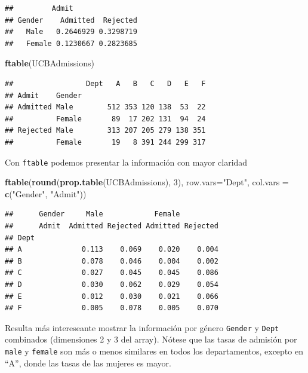 \documentclass[]{book}
\newenvironment{Shaded}{\begin{snugshade}}{\end{snugshade}}
\newcommand{\KeywordTok}[1]{\textcolor[rgb]{0.13,0.29,0.53}{\textbf{#1}}}
\newcommand{\DataTypeTok}[1]{\textcolor[rgb]{0.13,0.29,0.53}{#1}}
\newcommand{\DecValTok}[1]{\textcolor[rgb]{0.00,0.00,0.81}{#1}}
\newcommand{\StringTok}[1]{\textcolor[rgb]{0.31,0.60,0.02}{#1}}
\newcommand{\NormalTok}[1]{#1}
\begin{document}
\begin{verbatim}
##         Admit
## Gender    Admitted  Rejected
##   Male   0.2646929 0.3298719
##   Female 0.1230667 0.2823685
\end{verbatim}

\begin{Shaded}
\begin{Highlighting}[]
\KeywordTok{ftable}\NormalTok{(UCBAdmissions)}
\end{Highlighting}
\end{Shaded}

\begin{verbatim}
##                 Dept   A   B   C   D   E   F
## Admit    Gender                             
## Admitted Male        512 353 120 138  53  22
##          Female       89  17 202 131  94  24
## Rejected Male        313 207 205 279 138 351
##          Female       19   8 391 244 299 317
\end{verbatim}

Con \texttt{ftable} podemos presentar la información con mayor claridad

\begin{Shaded}
\begin{Highlighting}[]
\KeywordTok{ftable}\NormalTok{(}\KeywordTok{round}\NormalTok{(}\KeywordTok{prop.table}\NormalTok{(UCBAdmissions), }\DecValTok{3}\NormalTok{),}
       \DataTypeTok{row.vars=}\StringTok{"Dept"}\NormalTok{, }\DataTypeTok{col.vars =} \KeywordTok{c}\NormalTok{(}\StringTok{"Gender"}\NormalTok{, }\StringTok{"Admit"}\NormalTok{))}
\end{Highlighting}
\end{Shaded}

\begin{verbatim}
##      Gender     Male            Female         
##      Admit  Admitted Rejected Admitted Rejected
## Dept                                           
## A              0.113    0.069    0.020    0.004
## B              0.078    0.046    0.004    0.002
## C              0.027    0.045    0.045    0.086
## D              0.030    0.062    0.029    0.054
## E              0.012    0.030    0.021    0.066
## F              0.005    0.078    0.005    0.070
\end{verbatim}

Resulta más intereseante mostrar la información por género
\texttt{Gender} y \texttt{Dept} combinados (dimensiones 2 y 3 del
array). Nótese que las tasas de admisión por \texttt{male} y
\texttt{female} son más o menos similares en todos los departamentos,
excepto en ``A'', donde las tasas de las mujeres es mayor.
\end{document}
